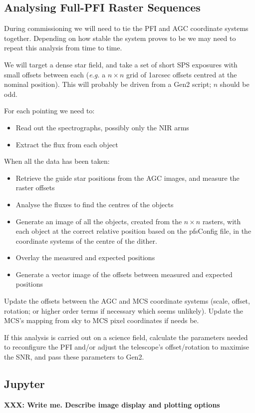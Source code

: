 \documentclass[12pt]{article}
\newcommand{\eg}{\textit{e.g.}\xspace}
\newcommand{\AGC}{\gls{AGC}\xspace}
\newcommand{\MCS}{\gls{MCS}\xspace}
\newcommand{\PFI}{\gls{PFI}\xspace}
\newcommand{\SPS}{\gls{SPS}\xspace}
\newcommand{\XXX}[1]{\textbf{XXX: #1}}
\begin{document}
\subsection{Analysing Full-PFI Raster Sequences}

During commissioning we will need to tie the \PFI and \AGC coordinate systems together.   Depending
on how stable the system proves to be we may need to repeat this analysis from time to time.

We will target a dense star field, and take a set of short \SPS exposures with small offsets
between each (\eg a $n\times n$ grid of 1arcsec offsets centred at the nominal position).  This
will probably be driven from a \gls{Gen2} script; $n$ should be odd.

For each pointing we need to:
\begin{itemize}
\item Read out the spectrographs, possibly only the \gls{NIR} arms
\item Extract the flux from each object
\end{itemize}

When all the data has been taken:
\begin{itemize}
\item Retrieve the guide star positions from the \AGC images, and measure the raster offsets
\item Analyse the fluxes to find the centres of the objects
\item Generate an image of all the objects, created from the $n\times n$ rasters, with each object
  at the correct relative position based on the \gls{pfsConfig} file, in the coordinate systems
  of the centre of the dither.
\item Overlay the measured and expected positions
\item Generate a vector image of the offsets between measured and expected positions
\end{itemize}

Update the offsets between the \AGC and \MCS coordinate systems (scale, offset, rotation; or higher
order terms if necessary which seems unlikely). Update the \MCS's mapping from sky to MCS pixel
coordinates if needs be.

If this analysis is carried out on a science field, calculate the parameters needed to reconfigure
the \PFI and/or adjust the telescope's offset/rotation to maximise the \gls{SNR}, and pass these
parameters to \gls{Gen2}.


\begin{appendices}

\section{Jupyter}
\label{sec:jupyter}

\XXX{Write me.  Describe image display and plotting options}

\end{appendices}

%
%
\printglossary[type=\acronymtype]
\printglossary
\end{document}
